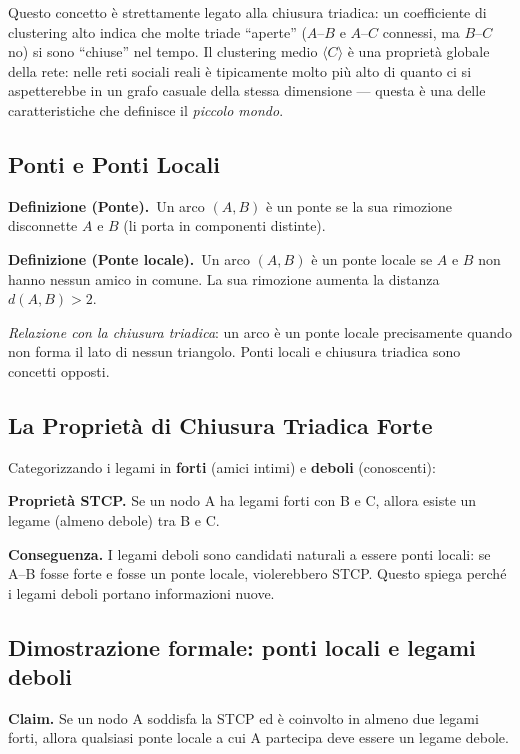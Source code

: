 \documentclass[12pt,a4paper]{article}
\newcommand{\definition}[2]{%
  \vspace{4pt}%
  \noindent\textbf{Definizione (#1).}\ #2\par\vspace{4pt}%
}
\begin{document}
Questo concetto è strettamente legato alla chiusura triadica: un coefficiente di clustering
alto indica che molte triade ``aperte'' ($A$--$B$ e $A$--$C$ connessi, ma $B$--$C$ no) si
sono ``chiuse'' nel tempo. Il clustering medio $\langle C \rangle$ è una proprietà globale
della rete: nelle reti sociali reali è tipicamente molto più alto di quanto ci si aspetterebbe
in un grafo casuale della stessa dimensione — questa è una delle caratteristiche che definisce
il \emph{piccolo mondo}.

\subsection{Ponti e Ponti Locali}

\definition{Ponte}{Un arco $(A,B)$ è un ponte se la sua rimozione disconnette $A$ e $B$
(li porta in componenti distinte).}

\definition{Ponte locale}{Un arco $(A,B)$ è un ponte locale se $A$ e $B$ non hanno
nessun amico in comune. La sua rimozione aumenta la distanza $d(A,B) > 2$.}

\noindent\textit{Relazione con la chiusura triadica}: un arco è un ponte locale precisamente
quando non forma il lato di nessun triangolo. Ponti locali e chiusura triadica sono concetti
opposti.

\subsection{La Proprietà di Chiusura Triadica Forte}

Categorizzando i legami in \textbf{forti} (amici intimi) e \textbf{deboli} (conoscenti):

\medskip
\noindent\textbf{Proprietà STCP.} Se un nodo A ha legami forti con B e C, allora esiste
un legame (almeno debole) tra B e C.

\medskip
\noindent\textbf{Conseguenza.} I legami deboli sono candidati naturali a essere ponti locali:
se A–B fosse forte e fosse un ponte locale, violerebbero STCP.
Questo spiega perché i legami deboli portano informazioni nuove.

\subsection{Dimostrazione formale: ponti locali e legami deboli}

\noindent\textbf{Claim.} Se un nodo A soddisfa la STCP ed è coinvolto in almeno due legami
forti, allora qualsiasi ponte locale a cui A partecipa deve essere un legame debole.
\end{document}
